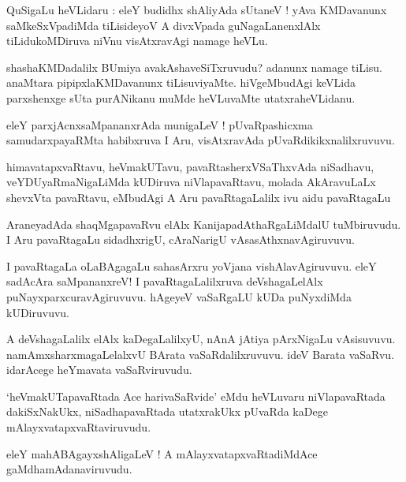 \documentclass{article}
\begin{document}
\begin{mn}
QuSigaLu heVLidaru : eleY budidhx shAliyAda sUtaneV ! yAva KMDavanunx 
saMkeSxVpadiMda tiLisideyoV A divxVpada guNagaLanenxlAlx 
tiLidukoMDiruva niVnu visAtxravAgi namage heVLu.
\end{mn}

\begin{mn}
shashaKMDadalilx BUmiya avakAshaveSiTxruvudu? adanunx namage tiLisu.
anaMtara pipipxlaKMDavanunx tiLisuviyaMte.
hiVgeMbudAgi keVLida parxshenxge sUta purANikanu muMde heVLuvaMte utatxraheVLidanu.
\end{mn}

\begin{mn}
eleY parxjAcnxsaMpananxrAda munigaLeV ! pUvaRpashicxma samudarxpayaRMta
habibxruva I Aru, visAtxravAda pUvaRdikikxnalilxruvuvu.
\end{mn}

\begin{mn}
himavatapxvaRtavu, heVmakUTavu, pavaRtasherxVSaThxvAda niSadhavu, 
veYDUyaRmaNigaLiMda kUDiruva niVlapavaRtavu, molada AkAravuLaLx shevxVta pavaRtavu, 
eMbudAgi A Aru pavaRtagaLalilx ivu aidu pavaRtagaLu
\end{mn}

\begin{mn}
AraneyadAda shaqMgapavaRvu elAlx KanijapadAthaRgaLiMdalU tuMbiruvudu. 
I Aru pavaRtagaLu sidadhxrigU, cAraNarigU vAsasAthxnavAgiruvuvu.
\end{mn}

\begin{mn}
I pavaRtagaLa oLaBAgagaLu sahasArxru yoVjana vishAlavAgiruvuvu. 
eleY sadAcAra saMpananxreV! I pavaRtagaLalilxruva 
deVshagaLelAlx puNayxparxcuravAgiruvuvu. 
hAgeyeV vaSaRgaLU kUDa puNyxdiMda kUDiruvuvu.
\end{mn}

\begin{mn}
A deVshagaLalilx elAlx kaDegaLalilxyU, nAnA jAtiya pArxNigaLu vAsisuvuvu. 
namAmxsharxmagaLelalxvU BArata vaSaRdalilxruvuvu. ideV Barata vaSaRvu. 
idarAcege heYmavata vaSaRviruvudu.
\end{mn}

\begin{mn}
`heVmakUTapavaRtada Ace harivaSaRvide' eMdu heVLuvaru niVlapavaRtada dakiSxNakUkx, 
niSadhapavaRtada utatxrakUkx pUvaRda kaDege mAlayxvatapxvaRtaviruvudu.
\end{mn}

\begin{mn}
eleY mahABAgayxshAligaLeV ! A mAlayxvatapxvaRtadiMdAce gaMdhamAdanaviruvudu.
\end{mn}
\end{document}
